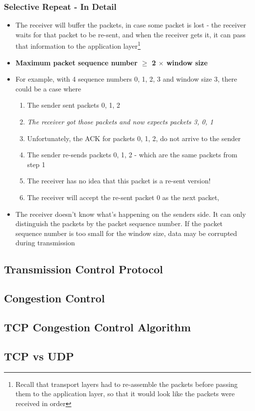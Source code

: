 \subsubsection{Selective Repeat - In Detail}
\begin{itemize}
	\item The receiver will buffer the packets, in case some packet is lost - the receiver waits for that packet to be re-sent, and when the receiver gets it, it can pass that information to the application layer\footnote{Recall that transport layers had to re-assemble the packets before passing them to the application layer, so that it would look like the packets were received in order}
	\item \textbf{Maximum packet sequence number $\geq$ 2 $\times$ window size}
	\item For example, with 4 sequence numbers 0, 1, 2, 3 and window size 3, there could be a case where
	\begin{enumerate}
		\item The sender sent packets 0, 1, 2
		\item \textit{The receiver got those packets and now expects packets 3, 0, 1}
		\item Unfortunately, the ACK for packets 0, 1, 2, do not arrive to the sender
		\item The sender re-sends packets 0, 1, 2 - which are the same packets from step 1
		\item The receiver has no idea that this packet is a re-sent version!
		\item The receiver will accept the re-sent packet 0 as the next packet,   
	\end{enumerate}
	\item The receiver doesn't know what's happening on the senders side. It can only distinguish the packets by the packet sequence number. If the packet sequence number is too small for the window size, data may be corrupted during transmission
\end{itemize}

\subsection{Transmission Control Protocol}

\subsection{Congestion Control}

\subsection{TCP Congestion Control Algorithm}

\subsection{TCP vs UDP}